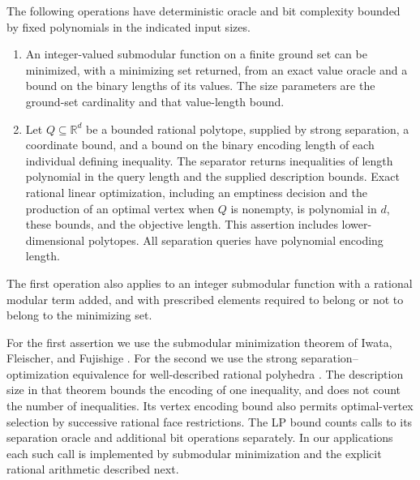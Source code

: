 \begin{proposition}\label{prop:oracle-tools}
The following operations have deterministic oracle and bit complexity
bounded by fixed polynomials in the indicated input sizes.
\begin{enumerate}
 \item An integer-valued submodular function on a finite ground set can
 be minimized, with a minimizing set returned, from an exact value oracle
 and a bound on the binary lengths of its values.  The size parameters are
 the ground-set cardinality and that value-length bound.
 \item Let $Q\subseteq\mathbb R^d$ be a bounded rational polytope, supplied
 by strong separation, a coordinate bound, and a bound on the binary
 encoding length of each individual defining inequality.  The separator
 returns inequalities of length polynomial in the query length and
 the supplied description bounds.  Exact rational
 linear optimization, including an emptiness decision and the production
 of an optimal vertex when $Q$ is nonempty, is polynomial in $d$, these
 bounds, and the objective length.  This assertion includes
 lower-dimensional polytopes.  All separation queries have polynomial
 encoding length.
\end{enumerate}
The first operation also applies to an integer submodular function with
a rational modular term added, and with prescribed elements required to
belong or not to belong to the minimizing set.
\end{proposition}

For the first assertion we use the submodular minimization theorem of
Iwata, Fleischer, and Fujishige \cite[Theorems 3.3 and 3.7]{IFF2001}.
For the second we use the strong separation--optimization equivalence
for well-described rational polyhedra
\cite[Definition 6.2.2, Theorem 6.4.9, and Remark 6.5.2]{GLS1988}.
The description size in that theorem bounds the encoding of one
inequality, and does not count the number of inequalities.  Its vertex
encoding bound also permits optimal-vertex selection by successive
rational face restrictions.
The LP bound counts calls to its separation oracle and additional bit
operations separately.  In our applications each such call is
implemented by submodular minimization and the explicit rational
arithmetic described next.

